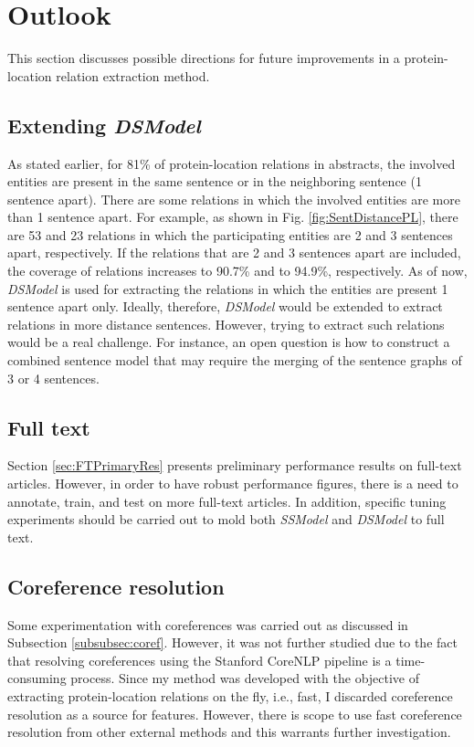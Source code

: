 \chapter{Outlook}\label{chapter:outlook}

This section discusses possible directions for future improvements in a protein-location relation extraction method.

\section{Extending \textit{DSModel}}

As stated earlier, for 81\% of protein-location relations in abstracts, the involved entities are present in the same sentence or in the neighboring sentence (1 sentence apart). There are some relations in which the involved entities are more than 1 sentence apart. For example, as shown in Fig. \ref{fig:SentDistancePL}, there are 53 and 23 relations in which the participating entities are 2 and 3 sentences apart, respectively. If the relations that are 2 and 3 sentences apart are included, the coverage of relations increases to 90.7\% and to 94.9\%, respectively. As of now, \textit{DSModel} is used for extracting the relations in which the entities are present 1 sentence apart only. Ideally, therefore, \textit{DSModel} would be extended to extract relations in more distance sentences. However, trying to extract such relations would be a real challenge. For instance, an open question is how to construct a combined sentence model that may require the merging of the sentence graphs of 3 or 4 sentences.

\section{Full text}

Section \ref{sec:FTPrimaryRes} presents preliminary performance results on full-text articles. However, in order to have robust performance figures, there is a need to annotate, train, and test on more full-text articles. In addition, specific tuning experiments should be carried out to mold both \textit{SSModel} and \textit{DSModel} to full text.

\section{Coreference resolution}

Some experimentation with coreferences was carried out as discussed in Subsection \ref{subsubsec:coref}. However, it was not further studied due to the fact that resolving coreferences using the Stanford CoreNLP pipeline \cite{manning2014stanford} is a time-consuming process. Since my method was developed with the objective of extracting protein-location relations on the fly, i.e., fast, I discarded coreference resolution as a source for features. However, there is scope to use fast coreference resolution from other external methods and this warrants further investigation.

